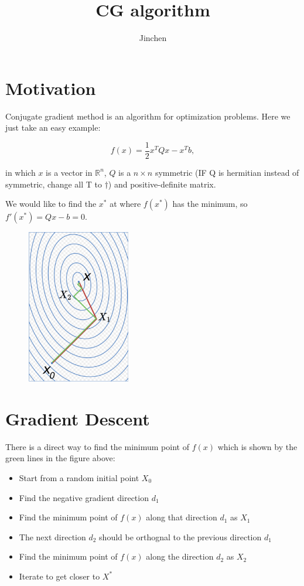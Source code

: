 \documentclass[11pt]{article} %
\title{CG algorithm}
\author{Jinchen}
\begin{document}
\maketitle

\section{Motivation}

\noindent 

Conjugate gradient method is an algorithm for optimization problems. Here we just take an easy example:

\[ f(x) = \frac{1}{2}x^T Q x - x^T b, \]

in which $x$ is a vector in $\mathbb{R}^n$, $Q$ is a $n \times n$ symmetric ({\color{red}IF Q is hermitian instead of symmetric, change all T to $\dagger$}) and positive-definite matrix.

We would like to find the $x^*$ at where $f(x^*)$ has the minimum, so $f'(x^*) = Q x - b = 0$.

\begin{figure}[!th]
\begin{center}
\includegraphics[width=0.4\textwidth]{fig1.png}
\caption{}
\end{center}
\end{figure}

\section{Gradient Descent}

\noindent

There is a direct way to find the minimum point of $f(x)$ which is shown by the green lines in the figure above:

\begin{itemize}
    \item Start from a random initial point $X_0$
    \item Find the negative gradient direction $d_1$
    \item Find the minimum point of $f(x)$ along that direction $d_1$ as $X_1$
    \item The next direction $d_2$ should be orthognal to the previous direction $d_1$
    \item Find the minimum point of $f(x)$ along the direction $d_2$ as $X_2$
    \item Iterate to get closer to $X^*$
\end{itemize}
\end{document}
